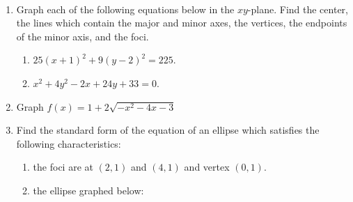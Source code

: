 \documentclass{ximera}
\begin{document}
\begin{example} \label{ellipsesfirstex} $~$

\begin{enumerate}

\item  Graph each of the following equations below in the $xy$-plane.  Find the center, the lines which contain the major and minor axes, the vertices, the endpoints of the minor axis, and the foci.

\begin{enumerate}

\item  $25(x+1)^2 + 9(y-2)^2 = 225$.  

\item \label{ctsellipseex}  $x^2+4y^2-2x+24y+33 = 0$.

\end{enumerate}

\item  Graph $f(x) = 1 + 2\sqrt{-x^2-4x-3}$

\item  Find the standard form of the equation of an ellipse which satisfies the following characteristics:

\begin{enumerate}

\item  the foci are at $(2,1)$ and $(4,1)$ and vertex $(0,1)$.

\item  the ellipse graphed below:

\begin{image}
\end{image}
\end{enumerate}
\end{enumerate}
\end{example}
\end{document}
